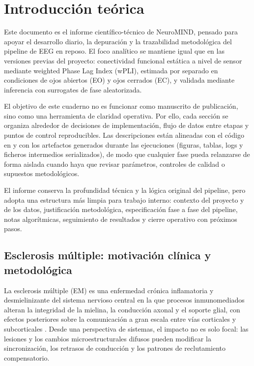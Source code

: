 \section{Introducción teórica}

Este documento es el informe científico-técnico de NeuroMIND, pensado para apoyar el desarrollo diario, la depuración y la trazabilidad metodológica del pipeline de EEG en reposo. El foco analítico se mantiene igual que en las versiones previas del proyecto: conectividad funcional estática a nivel de sensor mediante weighted Phase Lag Index (wPLI), estimada por separado en condiciones de ojos abiertos (EO) y ojos cerrados (EC), y validada mediante inferencia con surrogates de fase aleatorizada.

El objetivo de este cuaderno no es funcionar como manuscrito de publicación, sino como una herramienta de claridad operativa. Por ello, cada sección se organiza alrededor de decisiones de implementación, flujo de datos entre etapas y puntos de control reproducibles. Las descripciones están alineadas con el código en \Julia{} y con los artefactos generados durante las ejecuciones (figuras, tablas, logs y ficheros intermedios serializados), de modo que cualquier fase pueda relanzarse de forma aislada cuando haya que revisar parámetros, controles de calidad o supuestos metodológicos.

El informe conserva la profundidad técnica y la lógica original del pipeline, pero adopta una estructura más limpia para trabajo interno: contexto del proyecto y de los datos, justificación metodológica, especificación fase a fase del pipeline, notas algorítmicas, seguimiento de resultados y cierre operativo con próximos pasos.

\subsection{Esclerosis múltiple: motivación clínica y metodológica}

La esclerosis múltiple (EM) es una enfermedad crónica inflamatoria y desmielinizante del sistema nervioso central en la que procesos inmunomediados alteran la integridad de la mielina, la conducción axonal y el soporte glial, con efectos posteriores sobre la comunicación a gran escala entre vías corticales y subcorticales \citep{Mestre2021}. Desde una perspectiva de sistemas, el impacto no es solo focal: las lesiones y los cambios microestructurales difusos pueden modificar la sincronización, los retrasos de conducción y los patrones de reclutamiento compensatorio.

